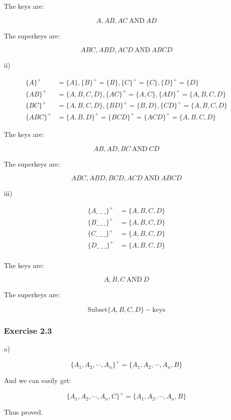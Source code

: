 The keys are:

$$
A, AB, AC \ \mbox{AND} \ AD
$$

The superkeys are:

$$
ABC, ABD, ACD \ \mbox{AND} \ ABCD
$$

ii)

\begin{align*}
  \{A\}^{+} &= \{A\},   \{B\}^{+} = \{B\},
  \{C\}^{+} = \{C\}, \{D\}^{+}= \{D\} \\
  \{AB\}^{+} &= \{A,B,C,D\},  \{AC\}^{+} = \{A,C\},
  \{AD\}^{+} = \{A,B,C,D\} \\
  \{BC\}^{+} &= \{A,B,C,D\}, \{BD\}^{+} = \{B,D\},
  \{CD\}^{+} = \{A,B,C,D\} \\
  \{ABC\}^{+} &= \{A,B,D\}^{+} = \{BCD\}^{+} = \{ACD\}^{+} = \{A,B,C,D\}
\end{align*}

The keys are:

$$
AB, AD, BC \ \mbox{AND} \ CD
$$

The superkeys are:

$$
ABC, ABD, BCD, ACD \ \mbox{AND} \ ABCD
$$


iii)

\begin{align*}
  \{A \_ \ \_ \ \_ \}^{+} &= \{A,B,C,D\} \\
  \{B\_ \ \_ \ \_ \}^{+} &= \{A,B,C,D\} \\
  \{C\_ \ \_ \ \_ \}^{+} &= \{A,B,C,D\} \\
  \{D\_ \ \_ \ \_ \}^{+} &= \{A,B,C,D\} \\
\end{align*}

The keys are:

$$
A, B, C \ \mbox{AND} \ D
$$

The superkeys are:

$$
\mbox{Subset} \{A,B,C,D\} - \mbox{keys}
$$

\subsubsection*{Exercise 2.3}

a)

$$
\{A_{1}, A_{2}, \cdots, A_{n}\} ^ {+} = \{A_{1}, A_{2}, \cdots, A_{n}, B\}
$$

And we can easily get:

$$
\{A_{1}, A_{2}, \cdots, A_{n}, C\} ^ {+} = \{A_{1}, A_{2}, \cdots, A_{n}, B\}
$$

Thus proved.

